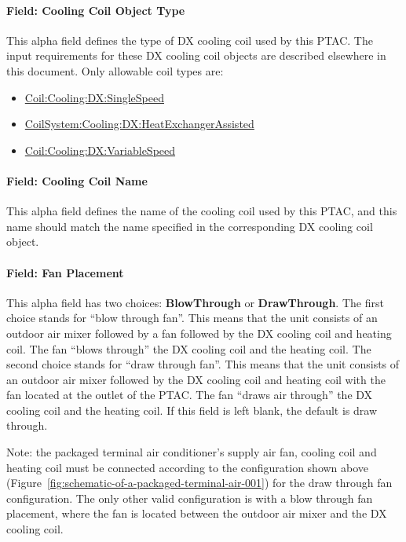\paragraph{Field: Cooling Coil Object Type}\label{field-cooling-coil-object-type-3-000}

This alpha field defines the type of DX cooling coil used by this PTAC. The input requirements for these DX cooling coil objects are described elsewhere in this document. Only allowable coil types are:

\begin{itemize}
\item
  \hyperref[coilcoolingdxsinglespeed]{Coil:Cooling:DX:SingleSpeed}
\item
  \hyperref[coilsystemcoolingdxheatexchangerassisted]{CoilSystem:Cooling:DX:HeatExchangerAssisted}
\item
  \hyperref[coilcoolingdxvariablespeed]{Coil:Cooling:DX:VariableSpeed}
\end{itemize}

\paragraph{Field: Cooling Coil Name}\label{field-cooling-coil-name-2-001}

This alpha field defines the name of the cooling coil used by this PTAC, and this name should match the name specified in the corresponding DX cooling coil object.

\paragraph{Field: Fan Placement}\label{field-fan-placement-3-000}

This alpha field has two choices: \textbf{BlowThrough} or \textbf{DrawThrough}. The first choice stands for ``blow through fan''. This means that the unit consists of an outdoor air mixer followed by a fan followed by the DX cooling coil and heating coil. The fan ``blows through'' the DX cooling coil and the heating coil. The second choice stands for ``draw through fan''. This means that the unit consists of an outdoor air mixer followed by the DX cooling coil and heating coil with the fan located at the outlet of the PTAC. The fan ``draws air through'' the DX cooling coil and the heating coil. If this field is left blank, the default is draw through.

Note: the packaged terminal air conditioner's supply air fan, cooling coil and heating coil must be connected according to the configuration shown above (Figure~\ref{fig:schematic-of-a-packaged-terminal-air-001}) for the draw through fan configuration. The only other valid configuration is with a blow through fan placement, where the fan is located between the outdoor air mixer and the DX cooling coil.

